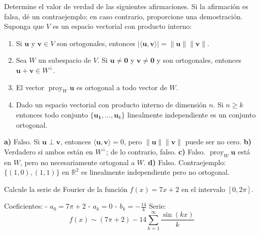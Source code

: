 \begin{prob}
Determine el valor de verdad de las siguientes afirmaciones. Si la afirmación es falsa, dé un contraejemplo; en caso contrario, proporcione una demostración. Suponga que $V$ es un espacio vectorial con producto interno:
\begin{enumerate}
\item Si $\mathbf{u}$ y $\mathbf{v}\in V$ son ortogonales, entonces $|\langle \mathbf{u},\mathbf{v} \rangle|=\lVert \mathbf{u} \rVert \lVert \mathbf{v} \rVert$.
\item Sea $W$ un subespacio de $V$. Si $\mathbf{u}\neq \mathbf{0}$ y $ \mathbf{v}\neq \mathbf{0}$ y son ortogonales, entonces $  \mathbf{u}+\mathbf{v} \in W^{\perp}$.
\item El vector $\operatorname{proy}_{W}\mathbf{u}$ es ortogonal a todo vector de $W$.
\item Dado un espacio vectorial con producto interno de dimensión $n$. Si $n\geq k$ entonces todo conjunto $\{\mathbf{u_1},\dots, \mathbf{u}_k\}$ linealmente independiente es un conjunto ortogonal.
\end{enumerate}
\begin{myproof}
\textbf{a)} Falso. Si \( \mathbf{u} \perp \mathbf{v} \), entonces \( \langle \mathbf{u}, \mathbf{v} \rangle = 0 \), pero \( \|\mathbf{u}\|\|\mathbf{v}\| \) puede ser no cero.  
\textbf{b)} Verdadero si ambos están en $W^{\perp}$; de lo contrario, falso.  
\textbf{c)} Falso. $\operatorname{proy}_W \mathbf{u}$ está en $W$, pero no necesariamente ortogonal a $W$.  
\textbf{d)} Falso. Contraejemplo: $\{(1,0), (1,1)\}$ en $\mathbb{R}^2$ es linealmente independiente pero no ortogonal.
\end{myproof}
\end{prob}

\begin{prob}
Calcule la serie de Fourier de la función $f(x)=7x+2$ en el intervalo $[0,2\pi]$.
\begin{myproof}
Coeficientes:
- \( a_0 = 7\pi + 2 \)
- \( a_k = 0 \)
- \( b_k = -\frac{14}{k} \)
Serie:
\[
\boxed{f(x) \sim (7\pi + 2) - 14 \sum_{k=1}^{\infty} \frac{\sin(kx)}{k}}
\]
\end{myproof}
\end{prob}

